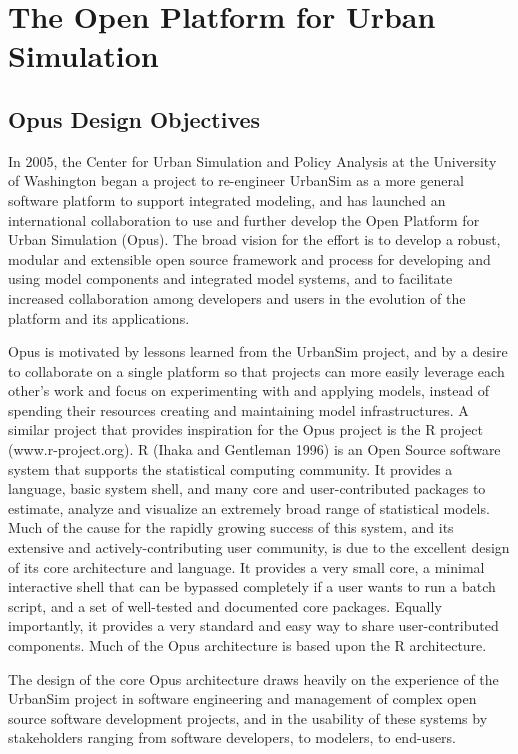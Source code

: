 \chapter{The Open Platform for Urban Simulation}

\section{Opus Design Objectives}
In 2005, the Center for Urban Simulation and Policy Analysis at the University of Washington 
began a project to re-engineer UrbanSim as a more general software platform to support
integrated modeling, and has launched an international collaboration to use and further 
develop the Open Platform for Urban Simulation (Opus).  The broad vision for the effort is 
to develop a robust, modular and extensible open source framework and process for 
developing and using model components and integrated model systems, and to facilitate 
increased collaboration among developers and users in the evolution of the platform and 
its applications.  

Opus is motivated by lessons learned from the UrbanSim project, and by a desire to collaborate 
on a single platform so that projects can more easily leverage each other's work and focus on 
experimenting with and applying models, instead of spending their resources creating and 
maintaining model infrastructures.  
A similar project that provides inspiration for the Opus project is the R project (www.r-project.org).  
R (Ihaka and Gentleman 1996) is an Open Source software system that supports the statistical 
computing community.  It provides a language, basic system shell, and many core and 
user-contributed packages to estimate, analyze and visualize an extremely broad range of statistical 
models.  Much of the cause for the rapidly growing success of this system, and its extensive and 
actively-contributing user community, is due to the excellent design of its core architecture and 
language.  It provides a very small core, a minimal interactive shell that can be bypassed completely 
if a user wants to run a batch script, and a set of well-tested and documented core packages.  Equally 
importantly, it provides a very standard and easy way to share user-contributed components.  Much 
of the Opus architecture is based upon the R architecture.

The design of the core Opus architecture draws heavily on the experience of the UrbanSim project in 
software engineering and management of complex open source software development projects, and 
in the usability of these systems by stakeholders ranging from software developers, to modelers, to 
end-users.   

